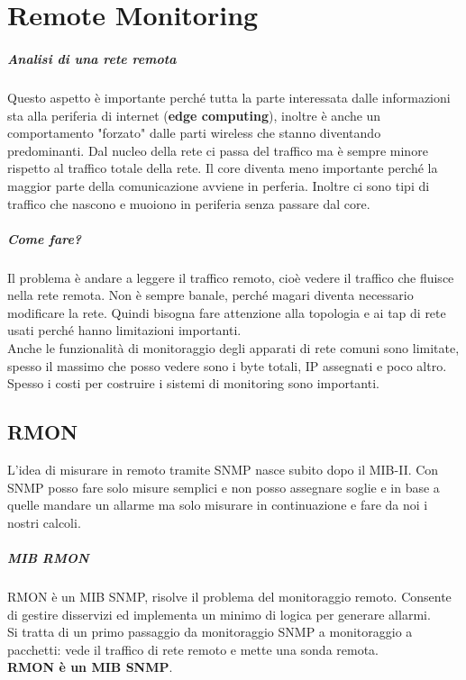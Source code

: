 \documentclass[10pt]{book}
\begin{document}
\chapter{Remote Monitoring}
\paragraph{Analisi di una rete remota} Questo aspetto è importante perché tutta la parte interessata dalle informazioni sta alla periferia di internet (\textbf{edge computing}), inoltre è anche un comportamento "forzato" dalle parti wireless che stanno diventando predominanti. Dal nucleo della rete ci passa del traffico ma è sempre minore rispetto al traffico totale della rete. Il core diventa meno importante perché la maggior parte della comunicazione avviene in perferia. Inoltre ci sono tipi di traffico che nascono e muoiono in periferia senza passare dal core.
\paragraph{Come fare?} Il problema è andare a leggere il traffico remoto, cioè vedere il traffico che fluisce nella rete remota. Non è sempre banale, perché magari diventa necessario modificare la rete. Quindi bisogna fare attenzione alla topologia e ai tap di rete usati perché hanno limitazioni importanti.\\
Anche le funzionalità di monitoraggio degli apparati di rete comuni sono limitate, spesso il massimo che posso vedere sono i byte totali, IP assegnati e poco altro. Spesso i costi per costruire i sistemi di monitoring sono importanti.
\section{RMON}
L'idea di misurare in remoto tramite SNMP nasce subito dopo il MIB-II. Con SNMP posso fare solo misure semplici e non posso assegnare soglie e in base a quelle mandare un allarme ma solo misurare in continuazione e fare da noi i nostri calcoli.
\paragraph{MIB RMON} RMON è un MIB SNMP, risolve il problema del monitoraggio remoto. Consente di gestire disservizi ed implementa un minimo di logica per generare allarmi.\\
Si tratta di un primo passaggio da monitoraggio SNMP a monitoraggio a pacchetti: vede il traffico di rete remoto e mette una sonda remota.\\
\textbf{RMON è un MIB SNMP}.
\end{document}
